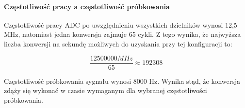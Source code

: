 \paragraph{Częstotliwość pracy a częstotliwość próbkowania}
    Częstotliwość pracy ADC po uwzględnieniu wszystkich dzielników wynosi
    12,5 MHz, natomiast jedna konwersja zajmuje 65 cykli. Z tego wynika,
    że najwyższa liczba konwersji na sekundę możliwych do uzyskania przy tej
    konfiguracji to:

    \begin{equation}
        \frac{12500000MHz}{65} \approx 192308
    \end{equation}

    Częstotliwość próbkowania sygnału wynosi 8000 Hz. Wynika stąd, że konwersja
    zdąży się wykonać w czasie wymaganym dla wybranej częstotliwości
    próbkowania.
